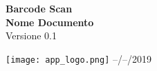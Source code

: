 \documentclass[20pt]{report}
\begin{document}
    \pagestyle{fancy}
    
    \vspace*{0.5cm}
    \flushright
    \textbf{Barcode Scan}\\
    \textbf{Nome Documento}\\
    Versione 0.1
    
    \vspace{1cm}
    \begin{center}
        \texttt{[image: app\_logo.png]}
        \vfill
        --/--/2019
    \end{center}
\end{document}
